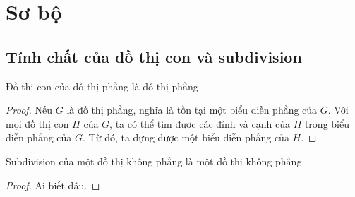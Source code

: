 \section{Sơ bộ}
\subsection{Tính chất của đồ thị con và subdivision}

\begin{corollary}
    Đồ thị con của đồ thị phẳng là đồ thị phẳng
\end{corollary}

\begin{proof}
    Nếu $G$ là đồ thị phẳng, nghĩa là tồn tại một biểu diễn phẳng của $G$. Với mọi đồ thị con
    $H$ của $G$, ta có thể tìm đươc các đỉnh và cạnh của $H$ trong biểu diễn phẳng của $G$.
    Từ đó, ta dựng được một biểu diễn phẳng của $H$.
\end{proof}


\begin{corollary}
    Subdivision của một đồ thị không phẳng là một đồ thị không phẳng.\end{corollary}
\begin{proof}
    Ai biết đâu.
\end{proof}

